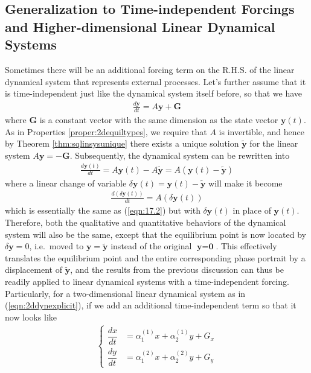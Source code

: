 \subsection{Generalization to Time-independent Forcings and Higher-dimensional Linear Dynamical Systems}

Sometimes there will be an additional forcing term on the R.H.S. of the linear dynamical system that represents external processes. Let's further assume that it is time-independent just like the dynamical system itself before, so that we have
\begin{align}
\frac{d\textbf{y}}{dt} = A\textbf{y} + \textbf{G}
\end{align}
where $\textbf{G}$ is a constant vector with the same dimension as the state vector $\textbf{y}(t)$. As in Properties \ref{proper:2dequiltypes}, we require that $A$ is invertible, and hence by Theorem \ref{thm:sqlinsysunique} there exists a unique solution $\tilde{\textbf{y}}$ for the linear system $A\textbf{y} = -\textbf{G}$. Subsequently, the dynamical system can be rewritten into
\begin{align}
\frac{d\textbf{y}(t)}{dt} = A\textbf{y}(t) - A\tilde{\textbf{y}} = A(\textbf{y}(t) - \tilde{\textbf{y}})     
\end{align}
where a linear change of variable $\delta\textbf{y}(t) = \textbf{y}(t) - \tilde{\textbf{y}}$ will make it become
\begin{align}
\frac{d(\delta\textbf{y}(t))}{dt} = A(\delta\textbf{y}(t)) 
\label{eqn:translateddynsys}
\end{align}
which is essentially the same as (\ref{eqn:17.2}) but with $\delta\textbf{y}(t)$ in place of $\textbf{y}(t)$. Therefore, both the qualitative and quantitative behaviors of the dynamical system will also be the same, except that the equilibrium point is now located by $\delta \textbf{y} = 0$, i.e.\ moved to $\textbf{y} = \tilde{\textbf{y}}$ instead of the original $\textbf{y} = \textbf{0}$. This effectively translates the equilibrium point and the entire corresponding phase portrait by a displacement of $\tilde{\textbf{y}}$, and the results from the previous discussion can thus be readily applied to linear dynamical systems with a time-independent forcing. Particularly, for a two-dimensional linear dynamical system as in (\ref{eqn:2ddynexplicit}), if we add an additional time-independent term so that it now looks like
\begin{align}
\left\{\begin{alignedat}{1}
\dfrac{dx}{dt} &= \alpha_1^{(1)} x + \alpha_2^{(1)} y + G_x \\
\dfrac{dy}{dt} &= \alpha_1^{(2)} x + \alpha_2^{(2)} y + G_y 
\end{alignedat}\right.
\end{align}
